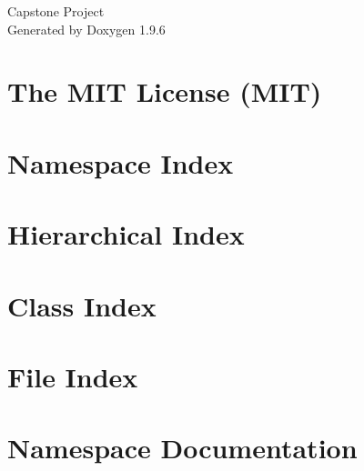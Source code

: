 \documentclass[twoside]{book}
\newcommand{\+}{\discretionary{\mbox{\scriptsize$\hookleftarrow$}}{}{}}
\newcommand{\clearemptydoublepage}{%
    \newpage{\pagestyle{empty}\cleardoublepage}%
  }
\begin{document}
  \raggedbottom
    \hypersetup{pageanchor=false,
                bookmarksnumbered=true,
                pdfencoding=unicode
               }
  \begin{titlepage}
  \vspace*{7cm}
  \begin{center}%
  {\Large Capstone Project}\\
  \vspace*{1cm}
  {\large Generated by Doxygen 1.9.6}\\
  \end{center}
  \end{titlepage}
  \clearemptydoublepage
  \tableofcontents
  \clearemptydoublepage
  \hypersetup{pageanchor=true}
\chapter{The MIT License (MIT)}
\label{md_wwwroot_lib_jquery_validation__l_i_c_e_n_s_e}

\chapter{Namespace Index}

\chapter{Hierarchical Index}

\chapter{Class Index}

\chapter{File Index}

\chapter{Namespace Documentation}








\end{document}
